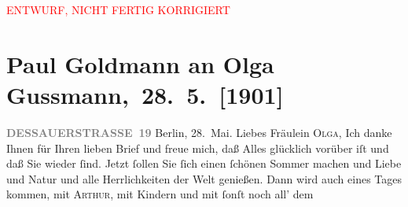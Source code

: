 
\begin{center}
            \textcolor{red}{ENTWURF, NICHT FERTIG KORRIGIERT}
                      \end{center}
            
         
         \renewcommand{\erwaehntePersonen}{Personen: Olga Schnitzler, Elisabeth Steinrück}
         \renewcommand{\erwaehnteOrte}{Orte: Berlin, Dessauer Straße, Wien, Wörthersee, XIX., Döbling}
         \renewcommand{\erwaehnteWerke}{}
               \section[ Paul Goldmann an Olga Gussmann, 28. 5. {[}1901{]}]{ Paul Goldmann an Olga Gussmann, 28. 5. {[}1901{]}}\nopagebreak{}\rehead{ }\begin{ledgroupsized}[t]{13cm}\normalsize\beginnumbering \toendnotes[C]{\smallbreak\pagebreak[2]} 
\toendnotes[C]{\smallbreak}\pstart
           \noindent{}\raggedleft{}{\pb}\textcolor{gray}{\textbf{DESSAUERSTRASSE 19}}\pend
           \pstart
           Berlin, 28. Mai.\pend
           \pstart\center{}Liebes Fräulein \textsc{Olga},\pend\pstart
           Ich danke Ihnen für Ihren lieben Brief und freue mich, daß Alles glücklich vorüber
               iſt und daß Sie wieder \label{K_L03528-1v}\label{K_L03528-1h} ſind. Jetzt ſollen Sie
               ſich einen ſchönen Sommer machen und Liebe und Natur und alle Herrlichkeiten der Welt
               genießen. Dann wird auch eines Tages \label{K_L03528-2v}\label{K_L03528-2h} kommen, mit
                  \textsc{Arthur}, mit Kindern und mit {\pb}ſonſt noch all’ dem

\end{ledgroupsized}
